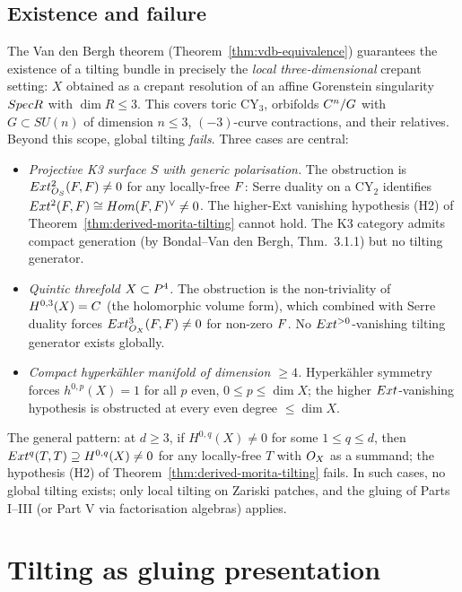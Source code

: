 \subsection*{Existence and failure}

The Van den Bergh theorem (Theorem~\ref{thm:vdb-equivalence}) guarantees the
existence of a tilting bundle in precisely the \emph{local three-dimensional}
crepant setting: $X$ obtained as a crepant resolution of an affine Gorenstein
singularity $Spec R$ with $\dim R \leq 3$. This covers toric CY$_3$,
orbifolds $C^n/G$ with $G \subset SU(n)$ of dimension $n \leq 3$,
$(-3)$-curve contractions, and their relatives. Beyond this scope, global
tilting \emph{fails}. Three cases are central:
\begin{itemize}
\item[(a)] \emph{Projective K3 surface $S$ with generic polarisation.} The
obstruction is $Ext^{2}_{O_S}(F, F) \neq 0$ for any locally-free $F$:
Serre duality on a CY$_2$ identifies
$Ext^2(F, F) \cong Hom(F, F)^{\vee} \neq 0$. The higher-Ext vanishing
hypothesis (H2) of Theorem~\ref{thm:derived-morita-tilting} cannot hold. The
K3 category admits compact generation (by Bondal--Van den Bergh, Thm.~3.1.1)
but no tilting generator.
\item[(b)] \emph{Quintic threefold $X \subset P^4$.} The obstruction is the
non-triviality of $H^{0,3}(X) = C$ (the holomorphic volume form), which
combined with Serre duality forces $Ext^3_{O_X}(F, F) \neq 0$ for
non-zero $F$. No $Ext^{>0}$-vanishing tilting generator exists globally.
\item[(c)] \emph{Compact hyperk\"ahler manifold of dimension $\geq 4$.}
Hyperk\"ahler symmetry forces $h^{0,p}(X) = 1$ for all $p$ even, $0 \leq p \leq
\dim X$; the higher $Ext$-vanishing hypothesis is obstructed at every even
degree $\leq \dim X$.
\end{itemize}
The general pattern: at $d \geq 3$, if $H^{0,q}(X) \neq 0$ for some $1 \leq q
\leq d$, then $Ext^q(T, T) \supseteq H^{0,q}(X) \neq 0$ for any
locally-free $T$ with $O_X$ as a summand; the hypothesis (H2) of
Theorem~\ref{thm:derived-morita-tilting} fails. In such cases, no global
tilting exists; only local tilting on Zariski patches, and the gluing of
Parts I--III (or Part V via factorisation algebras) applies.

\section{Tilting as gluing presentation}
\label{sec:tilting-as-gluing}

